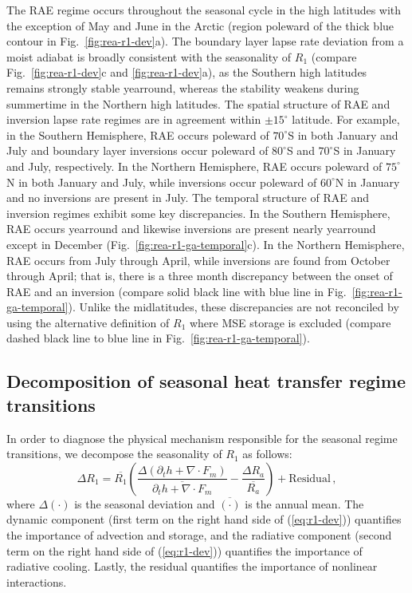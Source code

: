 \documentclass{ametsocV5}
\begin{document}
    The RAE regime occurs throughout the seasonal cycle in the high latitudes with the exception of May and June in the Arctic (region poleward of the thick blue contour in Fig.~\ref{fig:rea-r1-dev}a). The boundary layer lapse rate deviation from a moist adiabat is broadly consistent with the seasonality of $R_1$ (compare Fig.~\ref{fig:rea-r1-dev}c and \ref{fig:rea-r1-dev}a), as the Southern high latitudes remains strongly stable yearround, whereas the stability weakens during summertime in the Northern high latitudes. The spatial structure of RAE and inversion lapse rate regimes are in agreement within $\pm 15^\circ$ latitude. For example, in the Southern Hemisphere, RAE occurs poleward of $70^\circ$S in both January and July and boundary layer inversions occur poleward of $80^\circ$S and $70^\circ$S in January and July, respectively. In the Northern Hemisphere, RAE occurs poleward of $75^\circ$N in both January and July, while inversions occur poleward of $60^\circ$N in January and no inversions are present in July. The temporal structure of RAE and inversion regimes exhibit some key discrepancies. In the Southern Hemisphere, RAE occurs yearround and likewise inversions are present nearly yearround except in December (Fig.~\ref{fig:rea-r1-ga-temporal}c). In the Northern Hemisphere, RAE occurs from July through April, while inversions are found from October through April; that is, there is a three month discrepancy between the onset of RAE and an inversion (compare solid black line with blue line in Fig.~\ref{fig:rea-r1-ga-temporal}). Unlike the midlatitudes, these discrepancies are not reconciled by using the alternative definition of $R_1$ where MSE storage is excluded (compare dashed black line to blue line in Fig.~\ref{fig:rea-r1-ga-temporal}).

    \subsection{Decomposition of seasonal heat transfer regime transitions}

    In order to diagnose the physical mechanism responsible for the seasonal regime transitions, we decompose the seasonality of $R_1$ as follows:
    \begin{equation}\label{eq:r1-dev}
      \Delta R_1 = \overline{R_1}\left( \frac{\Delta(\partial_t h + \nabla\cdot F_m)}{\overline{\partial_t h + \nabla\cdot F_m}}  - \frac{\Delta R_a }{\overline{R_a}}\right) + \mathrm{Residual} \, ,
    \end{equation}
    where $\Delta(\cdot)$ is the seasonal deviation and $\overline{(\cdot)}$ is the annual mean. The dynamic component (first term on the right hand side of (\ref{eq:r1-dev})) quantifies the importance of advection and storage, and the radiative component (second term on the right hand side of (\ref{eq:r1-dev})) quantifies the importance of radiative cooling. Lastly, the residual quantifies the importance of nonlinear interactions.
\end{document}
